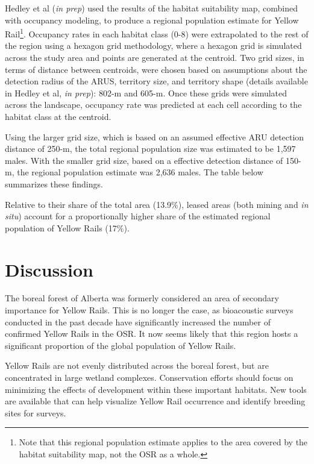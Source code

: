 \documentclass[11pt,]{article}
\let\rmarkdownfootnote\footnote%
\def\footnote{\protect\rmarkdownfootnote}
\begin{document}
Hedley et al (\emph{in prep}) used the results of the habitat
suitability map, combined with occupancy modeling, to produce a regional
population estimate for Yellow Rail\footnote{Note that this regional
  population estimate applies to the area covered by the habitat
  suitability map, not the OSR as a whole.}. Occupancy rates in each
habitat class (0-8) were extrapolated to the rest of the region using a
hexagon grid methodology, where a hexagon grid is simulated across the
study area and points are generated at the centroid. Two grid sizes, in
terms of distance between centroids, were chosen based on assumptions
about the detection radius of the ARUS, territory size, and territory
shape (details available in Hedley et al, \emph{in prep}): 802-m and
605-m. Once these grids were simulated across the landscape, occupancy
rate was predicted at each cell according to the habitat class at the
centroid.

Using the larger grid size, which is based on an assumed effective ARU
detection distance of 250-m, the total regional population size was
estimated to be 1,597 males. With the smaller grid size, based on a
effective detection distance of 150-m, the regional population estimate
was 2,636 males. The table below summarizes these findings.

Relative to their share of the total area (13.9\%), leased areas (both
mining and \emph{in situ}) account for a proportionally higher share of
the estimated regional population of Yellow Rails (17\%).

\section{Discussion}\label{discussion}

The boreal forest of Alberta was formerly considered an area of
secondary importance for Yellow Rails. This is no longer the case, as
bioacoustic surveys conducted in the past decade have significantly
increased the number of confirmed Yellow Rails in the OSR. It now seems
likely that this region hosts a significant proportion of the global
population of Yellow Rails.

Yellow Rails are not evenly distributed across the boreal forest, but
are concentrated in large wetland complexes. Conservation efforts should
focus on minimizing the effects of development within these important
habitats. New tools are available that can help visualize Yellow Rail
occurrence and identify breeding sites for surveys.
\end{document}
